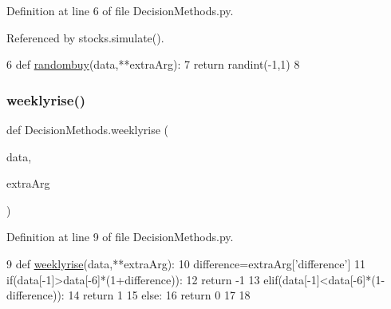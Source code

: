 Definition at line 6 of file Decision\+Methods.\+py.



Referenced by stocks.\+simulate().


\begin{DoxyCode}
6 \textcolor{keyword}{def }\hyperlink{namespaceDecisionMethods_a44bd5be577a4d99d6b2d144ad405dd09}{randombuy}(data,**extraArg):
7     \textcolor{keywordflow}{return} randint(-1,1)
8 
\end{DoxyCode}
\hypertarget{namespaceDecisionMethods_aed1379cd4db8a24d6e5e45908a88cb4b}{}\label{namespaceDecisionMethods_aed1379cd4db8a24d6e5e45908a88cb4b} 
\subsubsection{\texorpdfstring{weeklyrise()}{weeklyrise()}}
{\footnotesize\ttfamily def Decision\+Methods.\+weeklyrise (\begin{DoxyParamCaption}\item[{}]{data,  }\item[{}]{extra\+Arg }\end{DoxyParamCaption})}



Definition at line 9 of file Decision\+Methods.\+py.


\begin{DoxyCode}
9 \textcolor{keyword}{def }\hyperlink{namespaceDecisionMethods_aed1379cd4db8a24d6e5e45908a88cb4b}{weeklyrise}(data,**extraArg):
10     difference=extraArg[\textcolor{stringliteral}{'difference'}]
11     if(data[-1]>data[-6]*(1+difference)):
12         \textcolor{keywordflow}{return} -1
13     elif(data[-1]<data[-6]*(1-difference)):
14         \textcolor{keywordflow}{return} 1
15     \textcolor{keywordflow}{else}:
16         \textcolor{keywordflow}{return} 0
17 
18 
\end{DoxyCode}
